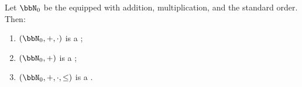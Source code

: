\begin{proposition} \label{proposition:natural_numbers_with_zero_form_commutative_semiring}
    Let $\bbN_0$ be the  equipped with addition, multiplication, and the standard order. Then:
    \begin{enumerate}
        \item $(\bbN_0, +, \cdot)$ is a ;
        \item $(\bbN_0, +)$ is a ;
        \item $(\bbN_0, +, \cdot, \leq)$ is a .
    \end{enumerate}
\end{proposition}

